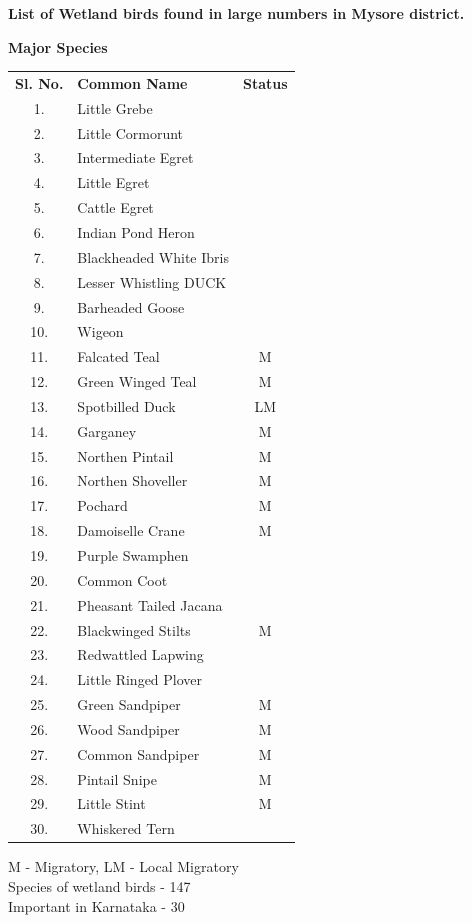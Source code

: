 \begin{center}
\smallskip
\textbf{List of Wetland birds found in large numbers in Mysore district.}

\smallskip
\textbf{Major Species}
\end{center}
{\renewcommand{\arraystretch}{1.1}
\begin{longtable}{cp{5cm}c}
\textbf{Sl. No.} & \textbf{Common Name} & \textbf{Status}\\
1. & Little Grebe &\\
2. & Little Cormorunt &\\
3. & Intermediate Egret& \\
4. & Little Egret &\\
5.	& Cattle Egret & \\ 
6.	& Indian Pond Heron & \\  
7.	& Blackheaded White Ibris & \\  
8.	& Lesser Whistling DUCK & \\  
9.	& Barheaded Goose & \\  
10.	& Wigeon & \\  
11.	& Falcated Teal  & M \\
12. & Green Winged Teal & M \\
13. & Spotbilled Duck & LM \\
14. & Garganey &M \\
15.	& Northen Pintail &M \\
16.	& Northen Shoveller & M \\
17.	& Pochard &M \\
18.	& Damoiselle Crane &M \\
19.	& Purple Swamphen &\\
20.	& Common Coot& \\
21.	& Pheasant Tailed Jacana &\\
22.	& Blackwinged Stilts &M \\
23.	& Redwattled Lapwing &\\
24.	& Little Ringed Plover& \\
25.	& Green Sandpiper& M \\
26.	& Wood Sandpiper &M \\
27.	& Common Sandpiper &M \\
28.	& Pintail Snipe &M \\
29.	& Little Stint &M \\
30.	& Whiskered Tern & 
\end{longtable}}


\begin{center}
M - Migratory, \qquad  LM - Local Migratory\\[0.1cm]
Species of wetland birds - 147 \\[0.1cm]
Important in Karnataka - 30 
\end{center}
